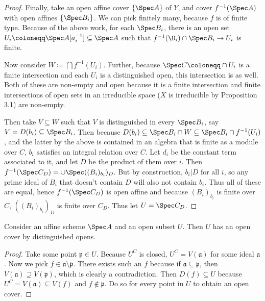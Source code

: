 \begin{proof}
	Finally, take an open affine cover $\{\Spec A\}   $ of $Y $, and cover $f^{-1}(\Spec A) $ with open affines $\{\Spec B_i\}   $.
	We can pick finitely many, because $f $ is of finite type.
	Because of the above work, for each $\Spec B_i $, there is an open set $U_i\coloneqq \Spec A[a_i^{-1}] \subseteq \Spec A$ such that $f^{-1}(\U_i)\cap \Spec B_i \to U_i $ is finite.

	Now consider $W \coloneqq \bigcap f^{-1}(U_i) $.
	Further, because $\Spec C \coloneqq \cap U_i $ is a finite intersection and each $U_i $ is a distinguished open, this intersection is as well.
	Both of these are non-empty and open because it is a finite intersection and finite intersections of open sets in an irreducible space ($X $ is irreducible by Proposition 3.1) are non-empty.

	Then take $V \subseteq W $ such that $V $ is distinguished in every $\Spec B_i $, say $V = D(b_i) \subseteq \Spec B_i$.
	Then because $D(b_i) \subseteq \Spec B_i\cap W \subseteq \Spec B_i \cap f^{-1}(U_i)$, and the latter by the above is contained in an algebra that is finite as a module over $C $, $b_i $ satisfies an integral relation over $C $.
	Let $d_i $ be the constant term associated to it, and let $D $ be the product of them over $i $.
	Then $f^{-1}(\Spec C_{D}) = \cup \Spec ((B_i)_{b_i})_{D}$.
	But by construction, $b_i |D $ for all $i $, so any prime ideal of $B_i $ that doesn't contain $D $ will also not contain $b_i $.
	Thus all of these are equal, hence $f^{-1}(\Spec C_D) $ is open affine and because $(B_i)_{b_i} $ is finite over $C $, $((B_i)_{b_i})_D $ is finite over $C_D $.
	Thus let $U = \Spec C_D $.
\end{proof}

\begin{lem}\label{lem:distinguished}
	Consider an affine scheme $\Spec A $ and an open subset $U $.
	Then $U $ has an open cover by distinguished opens.
\end{lem}
\begin{proof}
	Take some point $\mathfrak{p} \in U$.
	Because $U^C $ is closed, $U^C = V(\mathfrak{a}) $ for some ideal $\mathfrak{a} $.
	Now we pick $f \in \mathfrak{a} \setminus \mathfrak{p} $.
	There exists such an $f $ because if $\mathfrak{a} \subseteq \mathfrak{p} $, then $V(\mathfrak{a}) \supseteq V(\mathfrak{p})$, which is clearly a contradiction.
	Then $D(f) \subseteq U$ because $U^C = V(\mathfrak{a}) \subseteq V(f)$ and $f\notin \mathfrak{p} $.
	Do so for every point in $U $ to obtain an open cover.
\end{proof}

